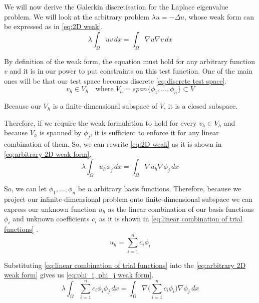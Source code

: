 \documentclass[conference]{IEEEtran}
\begin{document}
We will now derive the Galerkin discretisation for the Laplace eigenvalue problem. We will look at the arbitrary problem $\lambda u = -\Delta u$, whose weak form can be expressed as in \ref{eq:2D weak}.
\begin{equation}
    \lambda \int_{\Omega}uv \, dx = \int_{\Omega}\nabla{u} \nabla{v} \, dx
    \label{eq:2D weak}
\end{equation}

By definition of the weak form, the equation must hold for any arbitrary function $v$ and it is in our power to put constraints on this test function. One of the main ones will be that our test space becomes discrete \ref{eq:discrete test space}.
\begin{equation}
    v_h \in V_h \quad \text{where } V_h = span\{\phi_1, \dots, \phi_n\} \subset V
    \label{eq:discrete test space}
\end{equation}

Because our $V_h$ is a finite-dimensional subspace of $V$, it is a closed subspace.

Therefore, if we require the weak formulation to hold for every $v_h \in V_h$ and because $V_h$ is spanned by $\phi_j$, it is sufficient to enforce it for any linear combination of them. So, we can rewrite \ref{eq:2D weak} as it is shown in \ref{eq:arbitrary 2D weak form}.
\begin{equation}
    \lambda \int_{\Omega}u_h\phi_j \, dx = \int_{\Omega}\nabla{u_h} \nabla{\phi_j} \, dx
    \label{eq:arbitrary 2D weak form}
\end{equation}

So, we can let $\phi_{1}, \dots , \phi_{n}$ be $n$ arbitrary basis functions. Therefore, because we project our infinite-dimensional problem onto finite-dimensional subspace we can express our unknown function $u_h$ as the linear combination of our basis functions $\phi_i$ and unknown coefficients $c_i$ as it is shown in \ref{eq:linear combination of trial functions} \cite{b0} \cite{b10}.
\begin{equation}
    u_h = \sum^n_{i=1}c_i \phi_i
    \label{eq:linear combination of trial functions}
\end{equation}

Substituting \ref{eq:linear combination of trial functions} into the \ref{eq:arbitrary 2D weak form} gives us \ref{eq:phi_i, phi_j weak form}.
\begin{equation}
    \lambda \int_\Omega \sum^n_{i=1}c_i \phi_i\phi_j \, dx = \int_\Omega \nabla \Bigg(\sum^n_{i=1}c_i \phi_i\Bigg)\nabla{\phi_j} \, dx
    \label{eq:phi_i, phi_j weak form}
\end{equation}
\end{document}
